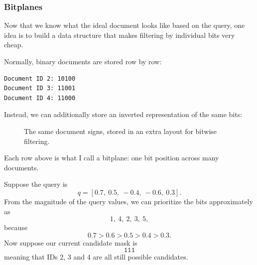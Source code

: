 \subsubsection{Bitplanes}
Now that we know what the ideal document looks like based on the query, one idea is to
build a data structure that makes filtering by individual bits very cheap.

Normally, binary documents are stored row by row:
\begin{verbatim}
Document ID 2: 10100
Document ID 3: 11001
Document ID 4: 11000
\end{verbatim}
Instead, we can additionally store an inverted representation of the same bits:

\begin{figure}[H]\centering
{}
\caption{The same document signs, stored in an extra layout for bitwise filtering.}
\end{figure}

Each row above is what I call a bitplane: one bit position across many documents.

Suppose the query is
\[
q=[0.7,\ 0.5,\ -0.4,\ -0.6,\ 0.3].
\]
From the magnitude of the query values, we can prioritize the bits approximately as
\[
1,\ 4,\ 2,\ 3,\ 5,
\]
because
\[
0.7>0.6>0.5>0.4>0.3.
\]
Now suppose our current candidate mask is
\[
\texttt{111}
\]
meaning that IDs 2, 3 and 4 are all still possible candidates.


